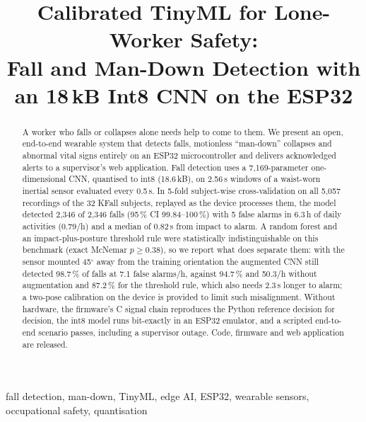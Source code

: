 \documentclass[conference]{IEEEtran}
\newcommand{\tbd}[1]{\textcolor{red}{#1}}
\begin{document}
\title{Calibrated TinyML for Lone-Worker Safety:\\Fall and Man-Down Detection with an 18\,kB Int8 CNN on the ESP32}

\author{\IEEEauthorblockN{\tbd{Author names}}
\IEEEauthorblockA{\tbd{Department, University}\\
\tbd{City, Country}\\
\tbd{email}}}

\maketitle

\begin{abstract}
A worker who falls or collapses alone needs help to come to them. We present an open,
end-to-end wearable system that detects falls, motionless ``man-down'' collapses and
abnormal vital signs entirely on an ESP32 microcontroller and delivers acknowledged alerts
to a supervisor's web application. Fall detection uses a 7{,}169-parameter
one-dimensional CNN, quantised to int8 (18.6\,kB), on 2.56\,s windows of a waist-worn
inertial sensor evaluated every 0.5\,s. In 5-fold subject-wise cross-validation on all
5{,}057 recordings of the 32 KFall subjects, replayed as the device processes them, the
model detected 2{,}346 of 2{,}346 falls (95\,\% CI 99.84--100\,\%) with 5 false
alarms in 6.3\,h of daily activities (0.79/h) and a median of 0.82\,s from impact to
alarm. A random forest and an impact-plus-posture threshold rule were statistically
indistinguishable on this benchmark (exact McNemar $p \geq 0.38$), so we report what does
separate them: with the sensor mounted 45$^\circ$ away from the training orientation the
augmented CNN still detected 98.7\,\% of falls at 7.1 false alarms/h, against 94.7\,\% and
50.3/h without augmentation and 87.2\,\% for the threshold rule, which also needs
2.3\,s longer to alarm; a two-pose calibration on the device is provided to limit such
misalignment. Without hardware, the firmware's C signal chain reproduces the Python
reference decision for decision, the int8 model runs bit-exactly in an ESP32 emulator, and
a scripted end-to-end scenario passes, including a supervisor outage. Code, firmware and
web application are released.
\end{abstract}

\begin{IEEEkeywords}
fall detection, man-down, TinyML, edge AI, ESP32, wearable sensors, occupational safety, quantisation
\end{IEEEkeywords}
\end{document}

